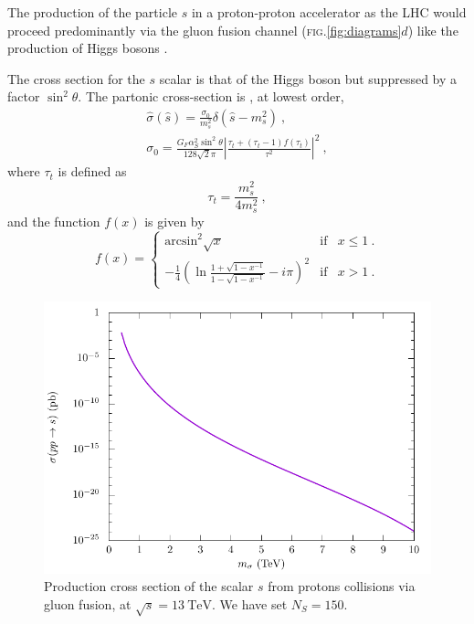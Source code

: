 \documentclass[aps,prd,preprintnumbers,nofootinbibn,twocolumn]{revtex4}
\begin{document}
The production of the particle $s$ in a proton-proton accelerator as the LHC would proceed predominantly via the gluon fusion channel (\textsc{fig.}\ref{fig:diagrams}$d$) like the production of Higgs bosons \cite{Dittmaier:2011ti}. 

The cross section for the $s$ scalar is that of the Higgs boson but suppressed by a factor $\sin^2\theta$. The partonic cross-section is \cite{Spira:1995rr}, at lowest order, 
\begin{align}
\hat{\sigma}(\hat{s}) = \frac{\sigma_0}{m_s^2}\delta(\hat{s}-m_s^2)\ ,\nonumber\\
\sigma_0 = \frac{G_F \alpha_S^2 \sin^2 \theta}{128\sqrt{2} \pi} \left|\frac{\tau_t + (\tau_t-1)f(\tau_t)}{\tau^2}  \right|^2\ ,
\end{align}
where $\tau_t$ is defined as
\begin{equation}
\tau_t =  \frac{m_s^2}{4m_s^2}\ ,
\end{equation}
and the function $f(x)$ is given by
\begin{equation}
f(x)= \left\{ \begin{array}{lcc}
\mathrm{arcsin}^2 \sqrt{x} & \mathrm{if} & x \leq 1\ .\\
-\frac{1}{4}\left(\ln \frac{1+\sqrt{1-x^{-1}}}{1-\sqrt{1-x^{-1}}}-i\pi\right)^2 & \mathrm{if} & x>1\ .
\end{array} \right.
\end{equation}

\begin{figure}[t]
\centering
\includegraphics[width=\columnwidth]{crossec}
\caption{Production cross section of the scalar $s$ from protons collisions via gluon fusion, at $\sqrt{s} = \SI{13}{\tera\electronvolt}$. We have set $N_S=150$.}\label{fig:crossect}
\end{figure}
\end{document}
